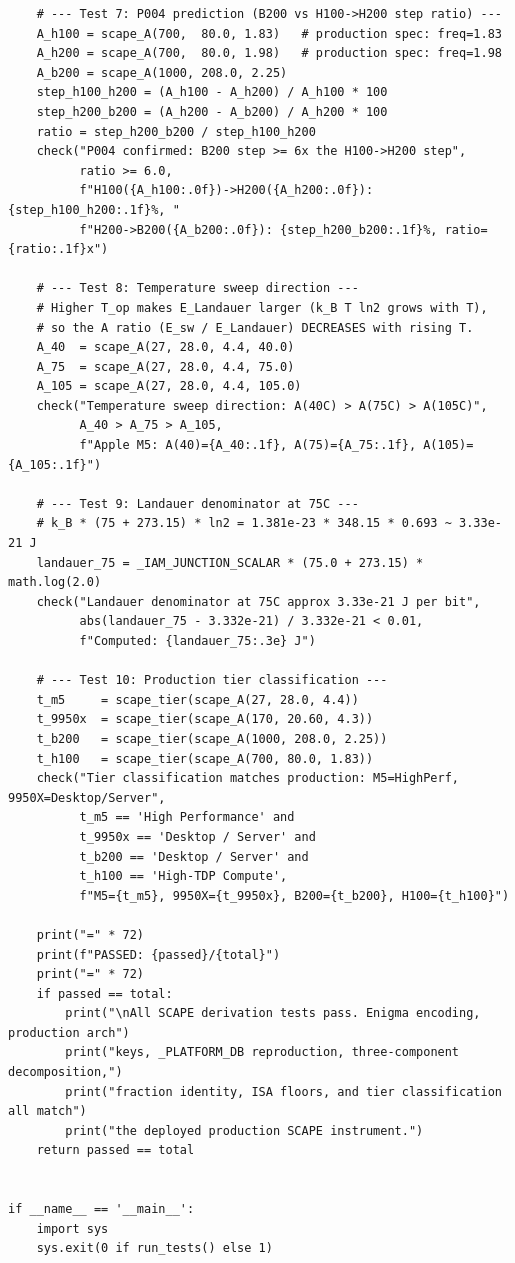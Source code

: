 \documentclass[12pt,a4paper]{article}
\begin{document}
\begin{verbatim}
    # --- Test 7: P004 prediction (B200 vs H100->H200 step ratio) ---
    A_h100 = scape_A(700,  80.0, 1.83)   # production spec: freq=1.83
    A_h200 = scape_A(700,  80.0, 1.98)   # production spec: freq=1.98
    A_b200 = scape_A(1000, 208.0, 2.25)
    step_h100_h200 = (A_h100 - A_h200) / A_h100 * 100
    step_h200_b200 = (A_h200 - A_b200) / A_h200 * 100
    ratio = step_h200_b200 / step_h100_h200
    check("P004 confirmed: B200 step >= 6x the H100->H200 step",
          ratio >= 6.0,
          f"H100({A_h100:.0f})->H200({A_h200:.0f}): {step_h100_h200:.1f}%, "
          f"H200->B200({A_b200:.0f}): {step_h200_b200:.1f}%, ratio={ratio:.1f}x")

    # --- Test 8: Temperature sweep direction ---
    # Higher T_op makes E_Landauer larger (k_B T ln2 grows with T),
    # so the A ratio (E_sw / E_Landauer) DECREASES with rising T.
    A_40  = scape_A(27, 28.0, 4.4, 40.0)
    A_75  = scape_A(27, 28.0, 4.4, 75.0)
    A_105 = scape_A(27, 28.0, 4.4, 105.0)
    check("Temperature sweep direction: A(40C) > A(75C) > A(105C)",
          A_40 > A_75 > A_105,
          f"Apple M5: A(40)={A_40:.1f}, A(75)={A_75:.1f}, A(105)={A_105:.1f}")

    # --- Test 9: Landauer denominator at 75C ---
    # k_B * (75 + 273.15) * ln2 = 1.381e-23 * 348.15 * 0.693 ~ 3.33e-21 J
    landauer_75 = _IAM_JUNCTION_SCALAR * (75.0 + 273.15) * math.log(2.0)
    check("Landauer denominator at 75C approx 3.33e-21 J per bit",
          abs(landauer_75 - 3.332e-21) / 3.332e-21 < 0.01,
          f"Computed: {landauer_75:.3e} J")

    # --- Test 10: Production tier classification ---
    t_m5     = scape_tier(scape_A(27, 28.0, 4.4))
    t_9950x  = scape_tier(scape_A(170, 20.60, 4.3))
    t_b200   = scape_tier(scape_A(1000, 208.0, 2.25))
    t_h100   = scape_tier(scape_A(700, 80.0, 1.83))
    check("Tier classification matches production: M5=HighPerf, 9950X=Desktop/Server",
          t_m5 == 'High Performance' and
          t_9950x == 'Desktop / Server' and
          t_b200 == 'Desktop / Server' and
          t_h100 == 'High-TDP Compute',
          f"M5={t_m5}, 9950X={t_9950x}, B200={t_b200}, H100={t_h100}")

    print("=" * 72)
    print(f"PASSED: {passed}/{total}")
    print("=" * 72)
    if passed == total:
        print("\nAll SCAPE derivation tests pass. Enigma encoding, production arch")
        print("keys, _PLATFORM_DB reproduction, three-component decomposition,")
        print("fraction identity, ISA floors, and tier classification all match")
        print("the deployed production SCAPE instrument.")
    return passed == total


if __name__ == '__main__':
    import sys
    sys.exit(0 if run_tests() else 1)
\end{verbatim}
\end{document}
